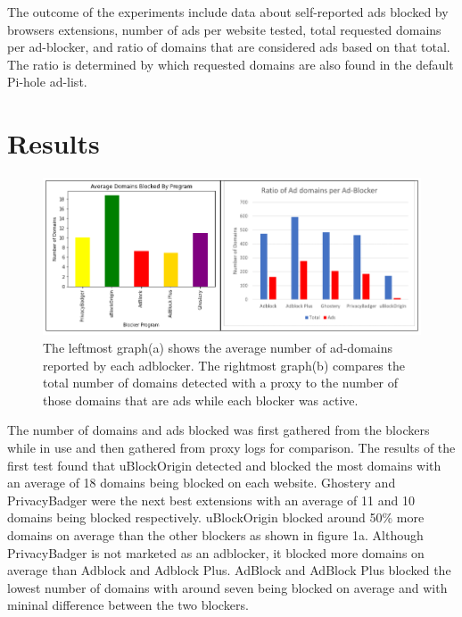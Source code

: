 \documentclass[sigsmall]{acmart}
\begin{document}
The outcome of the experiments include data about self-reported ads blocked by browsers extensions, number of ads per website tested, total requested domains per ad-blocker, and ratio of domains that are considered ads based on that total. The ratio is determined by which requested domains are also found in the default Pi-hole ad-list.

\section*{Results}
\begin{figure}[h!]
  \includegraphics[scale = 0.75]{Edit3.png}
  \caption{ The leftmost graph(a) shows the average number of ad-domains reported by each adblocker. The rightmost graph(b) compares the total number of domains detected with a proxy to the number of those domains that are ads while each blocker was active.}
  \label{fig:graph1ab}
\end{figure}

The number of domains and ads blocked was first gathered from the blockers while in use and then gathered from proxy logs for comparison. The results of the first test found that uBlockOrigin detected and blocked the most domains with an average of 18 domains being blocked on each website. Ghostery and PrivacyBadger were the next best extensions with an average of 11 and 10 domains being blocked respectively. uBlockOrigin blocked around 50\% more domains on average than the other blockers as shown in figure 1a. Although PrivacyBadger is not marketed as an adblocker, it blocked more domains on average than Adblock and Adblock Plus. 
AdBlock and AdBlock Plus blocked the lowest number of domains with around seven being blocked on average and with mininal difference between the two blockers.  
 
\end{document}
